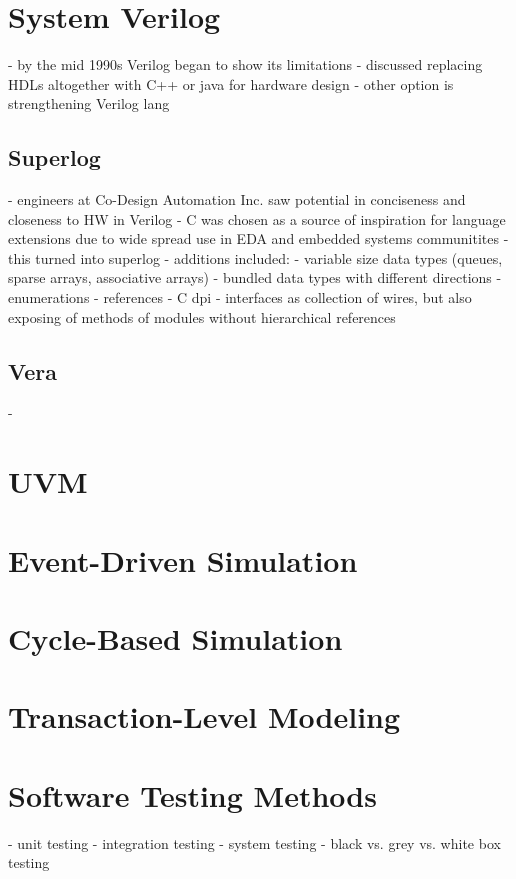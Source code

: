 \documentclass[11pt]{article}
\begin{document}
\section{System Verilog}

\cite[Sec. 6, pp. 43]{flake2020a}
- by the mid 1990s Verilog began to show its limitations 
- discussed replacing HDLs altogether with C++ or java for hardware design
- other option is strengthening Verilog lang


\subsection{Superlog}

\citeauthor{flake2020a} \cite[Sec. 6, pp. 44-49]{flake2020a}
- engineers at Co-Design Automation Inc. saw potential in conciseness and closeness to HW in Verilog
- C was chosen as a source of inspiration for language extensions due to wide spread use in EDA and embedded systems communitites
- this turned into superlog
- additions included:
  - variable size data types (queues, sparse arrays, associative arrays)
  - bundled data types with different directions
  - enumerations
  - references
  - C dpi
  - interfaces as collection of wires, but also exposing of methods of modules without hierarchical references

\subsection{Vera}

\cite[Sec. 7, pp. 51-??]{flake2020a}
- 

\section{UVM}

\section{Event-Driven Simulation}

\section{Cycle-Based Simulation}

\section{Transaction-Level Modeling}

\section{Software Testing Methods}
- unit testing
- integration testing
- system testing
- black vs. grey vs. white box testing


\printbibliography
\end{document}
